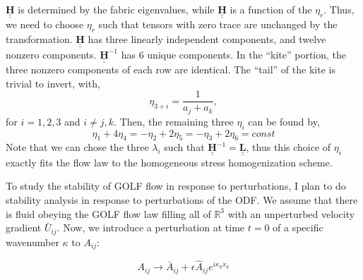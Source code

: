 \documentclass{article}
\begin{document}
$\underline{\underline{\mathbf{H}}}$ is determined by the fabric eigenvalues, while $\underline{\underline{\mathbf{H}}}$ is a function of the $\eta_r$. Thus, we need to choose $\eta_r$ such that tensors with zero trace are unchanged by the transformation. $\underline{\underline{\mathbf{H}}}$ has three linearly independent components, and twelve nonzero components. $\underline{\underline{\mathbf{H}}}^{-1}$ has 6 unique components. In the ``kite'' portion, the three nonzero components of each row are identical. The ``tail'' of the kite is trivial to invert, with, 
\begin{equation}
   \eta_{3 + i} = \frac{1}{a_j + a_k},
\end{equation}
for  $i=1,2,3$ and $i \neq j,k$. Then, the remaining three $\eta_i$ can be found by,
\begin{equation}
   \eta_1 + 4 \eta_4 = -\eta_2 + 2 \eta_5 = -\eta_3 + 2 \eta_6 = const
\end{equation}
Note that we can chose the three $\lambda_i$ such that $\underline{\underline{\mathbf{H}}}^{-1} = \underline{\underline{\mathbf{L}}}$, thus this choice of $\eta_i$ exactly fits the flow law to the homogeneous stress homogenization scheme.

To study the stability of GOLF flow in response to perturbations, I plan to do stability analysis in response to perturbations of the ODF. We assume that there is fluid obeying the GOLF flow law filling all of $\mathbb{R}^3$ with an unperturbed velocity gradient $\bar{U}_{ij}$. Now, we introduce a perturbation at time $t=0$ of a specific wavenumber $\kappa$ to $A_{ij}$:

\begin{equation}
   A_{ij} \rightarrow \bar{A}_{ij} +  \epsilon \hat{A}_{ij} e^{i \kappa_k x_k}
\end{equation}
\end{document}
